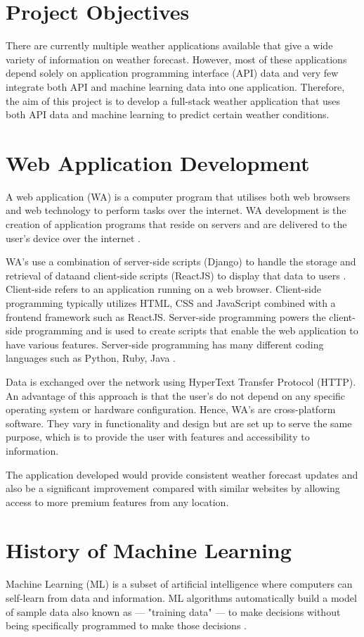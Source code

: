 \section{Project Objectives}
There are currently multiple weather applications available that give a wide variety of information on weather forecast. However, most of these applications depend solely on application programming interface (API) data and very few integrate both API and machine learning data into one application. Therefore, the aim of this project is to develop a full-stack weather application that uses both API data and machine learning to predict certain weather conditions. 

\section{Web Application Development}
A web application (WA) is a computer program that utilises both web browsers and web technology to perform tasks over the internet. WA development is the creation of application programs that reside on servers and are delivered to the user's device over the internet \cite{WebAppDef}.

WA's use a combination of server-side scripts (Django) to handle the storage and retrieval of dataand client-side scripts (ReactJS) to display that data to users \cite{WebApp}. Client-side refers to an application running on a web browser. Client-side programming typically utilizes HTML, CSS and JavaScript combined with a frontend framework such as ReactJS. Server-side programming powers the client-side programming and is used to create scripts that enable the web application to have various features. Server-side programming has many different coding languages such as Python, Ruby, Java \cite{WebAppDef}.

Data is exchanged over the network using HyperText Transfer Protocol (HTTP). An advantage of this approach is that the user's do not depend on any specific operating system or hardware configuration. Hence, WA's are cross-platform software. They vary in functionality and design but are set up to serve the same purpose, which is to provide the user with features and accessibility to information.

The application developed would provide consistent weather forecast updates and also be a significant improvement compared with similar websites by allowing access to more premium features from any location. 

\section{History of Machine Learning}
Machine Learning (ML) is a subset of artificial intelligence where computers can self-learn from data and information. ML algorithms automatically build a model of sample data also known as — "training data" — to make decisions without being specifically programmed to make those decisions \cite{MLAlgorithms}.


